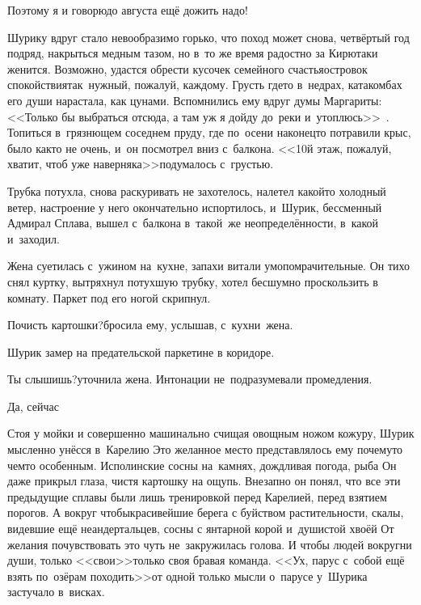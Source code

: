 {	\diagdash Поэтому я и говорю\mdash до августа ещё дожить надо!
	
	Шурику вдруг стало невообразимо горько, что поход может снова, четвёртый год подряд, накрыться медным тазом, но в~то же время радостно за Кирю\mdash таки женится. Возможно, удастся обрести кусочек семейного счастья\mdash островок спокойствия\mdash так~нужный, пожалуй, каждому. Грусть где\sdash то в~недрах, катакомбах его души нарастала, как цунами. Вспомнились ему вдруг думы Маргариты: <<Только бы выбраться отсюда, а там уж я дойду до~реки и~утоплюсь>>~\cite{МастерМаргарита}. Топиться в~грязнющем соседнем пруду, где по~осени наконец\sdash то потравили крыс, было как\sdash то не очень, и~он посмотрел вниз с~балкона. <<10\sdash й этаж, пожалуй, хватит, чтоб уже наверняка\myldots{}>>\mdash подумалось с~грустью.
	
	Трубка потухла, снова раскуривать не захотелось, налетел какой\sdash то холодный ветер, настроение у него окончательно испортилось, и~Шурик, бессменный Адмирал Сплава, вышел с~балкона в~такой~же неопределённости, в~какой и~заходил.
	
	Жена суетилась с~ужином на~кухне, запахи витали умопомрачительные. Он тихо снял куртку, вытряхнул потухшую трубку, хотел бесшумно проскользить в комнату. Паркет под его ногой скрипнул. 
	
	\diagdash Почисть картошки?\mdash бросила ему, услышав, с~кухни~жена.
	
	Шурик замер на предательской паркетине в коридоре.
	
	\diagdash Ты слышишь?\mdash уточнила жена. Интонации не~подразумевали промедления.
	
	\diagdash Да, сейчас\myldots{}
	
	Стоя у мойки и совершенно машинально счищая овощным ножом кожуру, Шурик мысленно унёсся в~Карелию\myldots{} Это желанное место представлялось ему почему\sdash то чем\sdash то особенным. Исполинские сосны на~камнях, дождливая погода, рыба\myldots{} Он даже прикрыл глаза, чистя картошку на ощупь. Внезапно он понял, что все эти предыдущие сплавы были лишь тренировкой перед Карелией, перед взятием порогов. А вокруг чтобы\mdash красивейшие берега с буйством растительности, скалы, видевшие ещё неандертальцев, сосны с янтарной корой и~душистой хвоёй\myldots{} От желания почувствовать это чуть не~закружилась голова. И чтобы людей вокруг\mdash ни души, только <<свои>>\mdash только своя бравая команда. <<Ух, парус с~собой ещё взять по~озёрам походить\myldots{}>>\mdash от одной только мысли о~парусе у~Шурика застучало в~висках.
	
}
